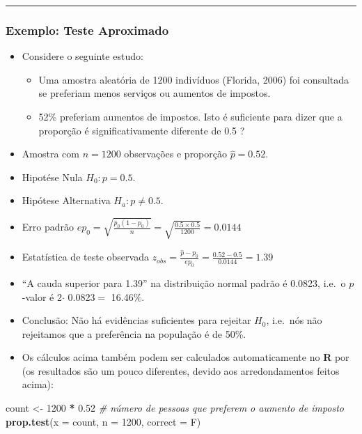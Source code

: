 \documentclass[]{article}
\newenvironment{Shaded}{\begin{snugshade}}{\end{snugshade}}
\newcommand{\KeywordTok}[1]{\textcolor[rgb]{0.13,0.29,0.53}{\textbf{#1}}}
\newcommand{\DataTypeTok}[1]{\textcolor[rgb]{0.13,0.29,0.53}{#1}}
\newcommand{\DecValTok}[1]{\textcolor[rgb]{0.00,0.00,0.81}{#1}}
\newcommand{\FloatTok}[1]{\textcolor[rgb]{0.00,0.00,0.81}{#1}}
\newcommand{\StringTok}[1]{\textcolor[rgb]{0.31,0.60,0.02}{#1}}
\newcommand{\CommentTok}[1]{\textcolor[rgb]{0.56,0.35,0.01}{\textit{#1}}}
\newcommand{\OperatorTok}[1]{\textcolor[rgb]{0.81,0.36,0.00}{\textbf{#1}}}
\newcommand{\NormalTok}[1]{#1}
\providecommand{\tightlist}{%
  \setlength{\itemsep}{0pt}\setlength{\parskip}{0pt}}
\begin{document}
\begin{center}\rule{0.5\linewidth}{\linethickness}\end{center}

\subsubsection{Exemplo: Teste
Aproximado}\label{exemplo-teste-aproximado}

\begin{itemize}
\tightlist
\item
  Considere o seguinte estudo:

  \begin{itemize}
  \tightlist
  \item
    Uma amostra aleatória de 1200 indivíduos (Florida, 2006) foi
    consultada se preferiam menos serviços ou aumentos de impostos.
  \item
    52\% preferiam aumentos de impostos. Isto é suficiente para dizer
    que a proporção é significativamente diferente de 0.5 ?
  \end{itemize}
\item
  Amostra com \(n = 1200\) observações e proporção \(\hat{p} = 0.52\).
\item
  Hipotése Nula \(H_0: p = 0.5\).
\item
  Hipótese Alternativa \(H_a: p \neq 0.5\).
\item
  Erro padrão
  \(ep_0 = \sqrt{\frac{p_0(1-p_0)}{n}} = \sqrt{\frac{0.5\times0.5}{1200}} = 0.0144\)
\item
  Estatística de teste observada
  \(z_{obs} = \frac{\hat{p}-p_0}{ep_0}=\frac{0.52-0.5}{0.0144}=1.39\)
\item
  ``A cauda superior para 1.39'' na distribuição normal padrão é 0.0823,
  i.e.~o \(p\)-valor é 2\(\cdot\) 0.0823\(=\) 16.46\%.
\item
  Conclusão: Não há evidências suficientes para rejeitar \(H_0\),
  i.e.~nós não rejeitamos que a preferência na população é de 50\%.
\item
  Os cálculos acima também podem ser calculados automaticamente no
  \textbf{R} por (os resultados são um pouco diferentes, devido aos
  arredondamentos feitos acima):
\end{itemize}

\begin{Shaded}
\begin{Highlighting}[]
\NormalTok{count <-}\StringTok{ }\DecValTok{1200} \OperatorTok{*}\StringTok{ }\FloatTok{0.52} \CommentTok{# número de pessoas que preferem o aumento de imposto}
\KeywordTok{prop.test}\NormalTok{(}\DataTypeTok{x =}\NormalTok{ count, }\DataTypeTok{n =} \DecValTok{1200}\NormalTok{, }\DataTypeTok{correct =}\NormalTok{ F)}
\end{Highlighting}
\end{Shaded}
\end{document}
